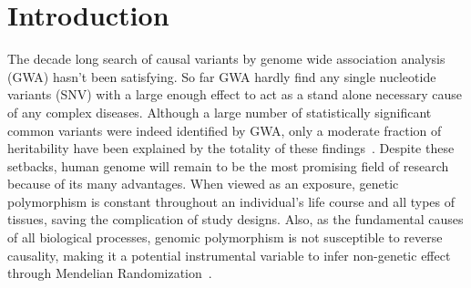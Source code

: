 \section{Introduction}
The decade long search of causal variants by genome wide association analysis (GWA) hasn’t been satisfying. So far GWA hardly find any single nucleotide variants (SNV) with a large enough effect to act as a stand alone necessary cause of any complex diseases. Although a large number of statistically significant common variants were indeed identified by GWA, only a moderate fraction of heritability have been explained by the totality of these findings~\cite{GWA1, GWA2}. Despite these setbacks, human genome will remain to be the most promising field of research because of its many advantages. When viewed as an exposure, genetic polymorphism is constant throughout an individual's life course and all types of tissues, saving the complication of study designs. Also, as the fundamental causes of all biological processes, genomic polymorphism is not susceptible to reverse causality, making it a potential instrumental variable to infer non-genetic effect through Mendelian Randomization~\cite{MR1, MR2}. 

